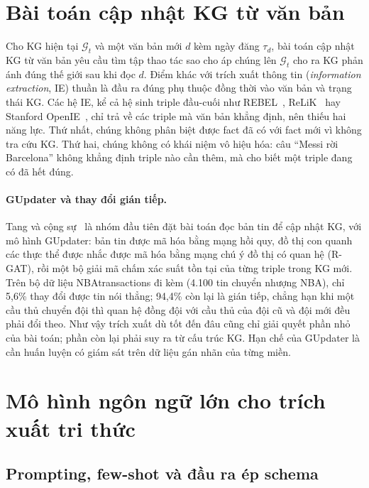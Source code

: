 \section{Bài toán cập nhật KG từ văn bản}\label{sec:bg-task}

Cho KG hiện tại $\mathcal{G}_t$ và một văn bản mới $d$ kèm ngày đăng $\tau_d$, bài toán cập nhật KG từ văn bản yêu cầu tìm tập thao tác sao cho áp chúng lên $\mathcal{G}_t$ cho ra KG phản ánh đúng thế giới sau khi đọc $d$.
Điểm khác với trích xuất thông tin (\textit{information extraction}, IE) thuần là đầu ra đúng phụ thuộc đồng thời vào văn bản và trạng thái KG.
Các hệ IE, kể cả hệ sinh triple đầu-cuối như REBEL~\cite{cabot2021rebel}, ReLiK~\cite{orlando2024relik} hay Stanford OpenIE~\cite{angeli2015openie}, chỉ trả về các triple mà văn bản khẳng định, nên thiếu hai năng lực.
Thứ nhất, chúng không phân biệt được fact đã có với fact mới vì không tra cứu KG.
Thứ hai, chúng không có khái niệm vô hiệu hóa: câu ``Messi rời Barcelona'' không khẳng định triple nào cần thêm, mà cho biết một triple đang có đã hết đúng.

\paragraph*{GUpdater và thay đổi gián tiếp.}
Tang và cộng sự~\cite{tang2019gupdate} là nhóm đầu tiên đặt bài toán đọc bản tin để cập nhật KG, với mô hình GUpdater: bản tin được mã hóa bằng mạng hồi quy, đồ thị con quanh các thực thể được nhắc được mã hóa bằng mạng chú ý đồ thị có quan hệ (R-GAT), rồi một bộ giải mã chấm xác suất tồn tại của từng triple trong KG mới.
Trên bộ dữ liệu NBAtransactions đi kèm (4.100 tin chuyển nhượng NBA), chỉ 5,6\% thay đổi được tin nói thẳng; 94,4\% còn lại là gián tiếp, chẳng hạn khi một cầu thủ chuyển đội thì quan hệ đồng đội với cầu thủ của đội cũ và đội mới đều phải đổi theo.
Như vậy trích xuất dù tốt đến đâu cũng chỉ giải quyết phần nhỏ của bài toán; phần còn lại phải suy ra từ cấu trúc KG.
Hạn chế của GUpdater là cần huấn luyện có giám sát trên dữ liệu gán nhãn của từng miền.

\section{Mô hình ngôn ngữ lớn cho trích xuất tri thức}\label{sec:bg-llm}

\subsection{Prompting, few-shot và đầu ra ép schema}

